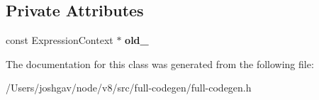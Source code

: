 \subsection*{Private Attributes}
\begin{DoxyCompactItemize}
\item 
const Expression\+Context $\ast$ {\bfseries old\+\_\+}\hypertarget{classv8_1_1internal_1_1_full_code_generator_1_1_b_a_s_e___e_m_b_e_d_d_e_d_a19e5a60efc1eb467335d8738c9022307}{}\label{classv8_1_1internal_1_1_full_code_generator_1_1_b_a_s_e___e_m_b_e_d_d_e_d_a19e5a60efc1eb467335d8738c9022307}

\end{DoxyCompactItemize}


The documentation for this class was generated from the following file\+:\begin{DoxyCompactItemize}
\item 
/\+Users/joshgav/node/v8/src/full-\/codegen/full-\/codegen.\+h\end{DoxyCompactItemize}
